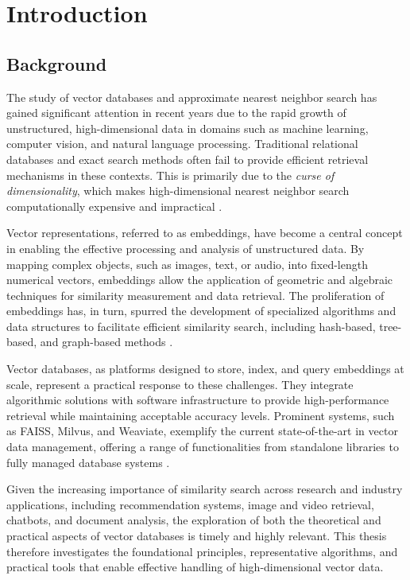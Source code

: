 \chapter{Introduction}

\section{Background}

The study of vector databases and approximate nearest neighbor search has gained significant attention in recent years due to the rapid growth of unstructured, high-dimensional data in domains such as machine learning, computer vision, and natural language processing. Traditional relational databases and exact search methods often fail to provide efficient retrieval mechanisms in these contexts. This is primarily due to the \textit{curse of dimensionality}, which makes high-dimensional nearest neighbor search computationally expensive and impractical \cite{Ukey-Yang-Li-Zhang-Hu-Zhang-2023}.

Vector representations, referred to as embeddings, have become a central concept in enabling the effective processing and analysis of unstructured data. By mapping complex objects, such as images, text, or audio, into fixed-length numerical vectors, embeddings allow the application of geometric and algebraic techniques for similarity measurement and data retrieval. The proliferation of embeddings has, in turn, spurred the development of specialized algorithms and data structures to facilitate efficient similarity search, including hash-based, tree-based, and graph-based methods \cite{Grohe-2020}.

Vector databases, as platforms designed to store, index, and query embeddings at scale, represent a practical response to these challenges. They integrate algorithmic solutions with software infrastructure to provide high-performance retrieval while maintaining acceptable accuracy levels. Prominent systems, such as FAISS, Milvus, and Weaviate, exemplify the current state-of-the-art in vector data management, offering a range of functionalities from standalone libraries to fully managed database systems \cite{faiss-2024, milvus-2021, weaviate-weaviate}.

Given the increasing importance of similarity search across research and industry applications, including recommendation systems, image and video retrieval, chatbots, and document analysis, the exploration of both the theoretical and practical aspects of vector databases is timely and highly relevant. This thesis therefore investigates the foundational principles, representative algorithms, and practical tools that enable effective handling of high-dimensional vector data.

